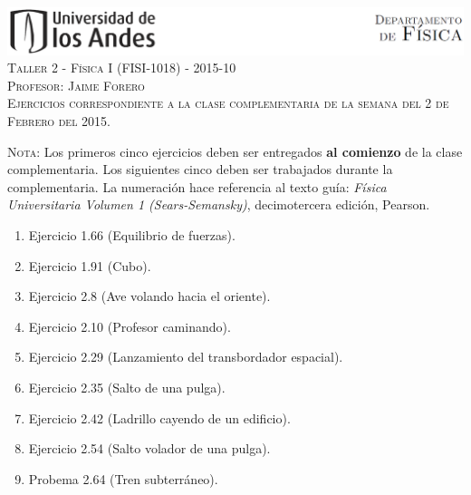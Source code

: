 \documentclass[letterpaper,10pt,onecolumn]{article}
\begin{document}
\begin{center}

\includegraphics[width=490pt]{header.png}\\[0.5cm]

\textsc{\LARGE Taller 2 - F\'isica I (FISI-1018) - 2015-10}\\[0.5cm]

\textsc{\Large{Profesor: Jaime Forero}} \\[0.5cm]

\noindent\textsc{Ejercicios correspondiente a la clase complementaria
  de la semana del 2 de Febrero del 2015.}\\[0.5cm]
\end{center}

\noindent\textsc{Nota:} Los primeros cinco ejercicios deben ser
entregados {\bf al comienzo} de la clase complementaria. Los siguientes
cinco deben ser trabajados durante la complementaria. La numeraci\'on
hace referencia al texto gu\'ia: \textit{F\'isica Universitaria Volumen
  1 (Sears-Semansky)}, decimotercera edici\'on, Pearson.

\begin{enumerate}
\item Ejercicio 1.66 (Equilibrio de fuerzas).
\item Ejercicio 1.91 (Cubo).
\item Ejercicio 2.8 (Ave volando hacia el oriente).
\item Ejercicio 2.10 (Profesor caminando).
\item Ejercicio 2.29 (Lanzamiento del transbordador espacial).
\item Ejercicio 2.35 (Salto de una pulga).
\item Ejercicio 2.42 (Ladrillo cayendo de un edificio).
\item Ejercicio 2.54 (Salto volador de una pulga).
\item Probema 2.64 (Tren subterr\'aneo).
\end{enumerate}
\end{document}
